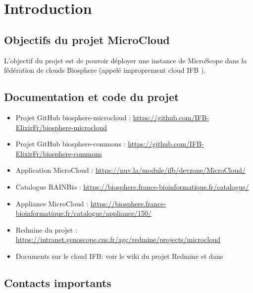 \chapter{Introduction}

\section{Objectifs du projet MicroCloud}

L'objectif du projet est de pouvoir déployer une instance de MicroScope dans la fédération de clouds Biosphere (appelé improprement \og{} cloud IFB \fg{}).

\section{Documentation et code du projet}

\begin{itemize}
	\item Projet GitHub biosphere-microcloud : \url{https://github.com/IFB-ElixirFr/biosphere-microcloud}
	\item Projet GitHub biosphere-commons : \url{https://github.com/IFB-ElixirFr/biosphere-commons}
	\item Application MicroCloud : \url{https://nuv.la/module/ifb/devzone/MicroCloud/}
	\item Catalogue RAINBio : \url{https://biosphere.france-bioinformatique.fr/catalogue/}
	\item Appliance MicroCloud : \url{https://biosphere.france-bioinformatique.fr/catalogue/appliance/150/}
	\item Redmine du projet : \url{https://intranet.genoscope.cns.fr/agc/redmine/projects/microcloud} 
	\item Documents sur le cloud IFB: voir le wiki du projet Redmine et dans 
\end{itemize}

\section{Contacts importants}

